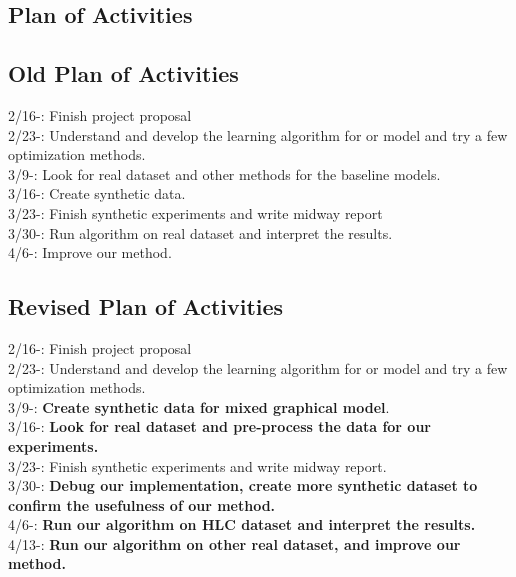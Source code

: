 \documentclass{article}
\begin{document}
\begin{appendices}
\section{Plan of Activities}
\subsection{Old Plan of Activities}
2/16-: Finish project proposal \\
2/23-: Understand and develop the learning algorithm for or model and try a few optimization methods. \\
3/9-: Look for real dataset and other methods for the baseline models.\\
3/16-:  Create synthetic data. \\ 
3/23-: Finish synthetic experiments and write midway report \\
3/30-: Run algorithm on real dataset and interpret the results. \\
4/6-: Improve our method. \\

\subsection{Revised Plan of Activities}

2/16-: Finish project proposal \\
2/23-: Understand and develop the learning algorithm for or model and try a few optimization methods. \\
3/9-:  \textbf{Create synthetic data for mixed graphical model}. \\ 
3/16-: \textbf{Look for real dataset and pre-process the data for our experiments.}\\
3/23-: Finish synthetic experiments and write midway report. \\
3/30-: \textbf{Debug our implementation, create more synthetic dataset to confirm the usefulness of our method.} \\
4/6-: \textbf{Run our algorithm on HLC dataset and interpret the results.} \\
4/13-: \textbf{Run our algorithm on other real dataset, and improve our method.} \\

\end{appendices}

\nocite{*}


\end{document}
